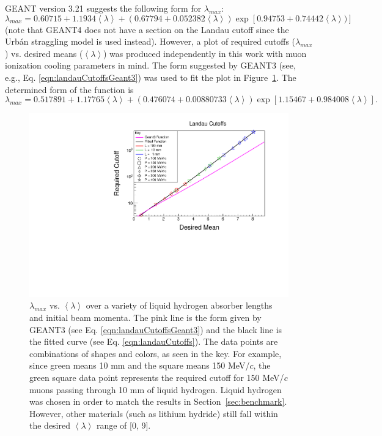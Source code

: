 GEANT version 3.21 \cite{geant3.21} suggests the following form for $\lambda_{max}$:
\begin{equation} \label{eqn:landauCutoffsGeant3}
\lambda_{max}=0.60715+1.1934\left<\lambda\right>+(0.67794+0.052382\left<\lambda\right>)\exp[0.94753+0.74442\left<\lambda\right>)]
\end{equation}
(note that GEANT4 does not have a section on the Landau cutoff since the Urb\'{a}n straggling model is used instead). However, a plot of required cutoffs ($\lambda_{max}$) vs. desired means ($\left<\lambda\right>$) was produced independently in this work with muon ionization cooling parameters in mind. The form suggested by GEANT3 (see, e.g., Eq. \eqref{eqn:landauCutoffsGeant3}) was used to fit the plot in Figure~\ref{fig:landau_cutoffs}. The determined form of the function is
\begin{equation}\label{eqn:landauCutoffs}
\lambda_{max}=0.517891+1.17765\left<\lambda\right>+(0.476074+0.00880733\left<\lambda\right>)\exp[1.15467+0.984008\left<\lambda\right>].
\end{equation}

\begin{figure}
  \centering
    \includegraphics[width=\textwidth]{Figures/landau_cutoffs} 
  \caption[$\lambda_{max}$ vs. $\left<\lambda\right>$ over a variety of liquid hydrogen absorber lengths and initial beam momenta.]{$\lambda_{max}$ vs. $\left<\lambda\right>$ over a variety of liquid hydrogen absorber lengths and initial beam momenta. The pink line is the form given by GEANT3 (see Eq. \eqref{eqn:landauCutoffsGeant3}) and the black line is the fitted curve (see Eq. \eqref{eqn:landauCutoffs}). The data points are combinations of shapes and colors, as seen in the key. For example, since green means 10 mm and the square means 150 MeV/$c$, the green square data point represents the required cutoff for 150 MeV/$c$ muons passing through 10 mm of liquid hydrogen. Liquid hydrogen was chosen in order to match the results in Section~\ref{sec:benchmark}. However, other materials (such as lithium hydride) still fall within the desired $\left<\lambda\right>$ range of [0, 9].}
  \label{fig:landau_cutoffs}
\end{figure}

